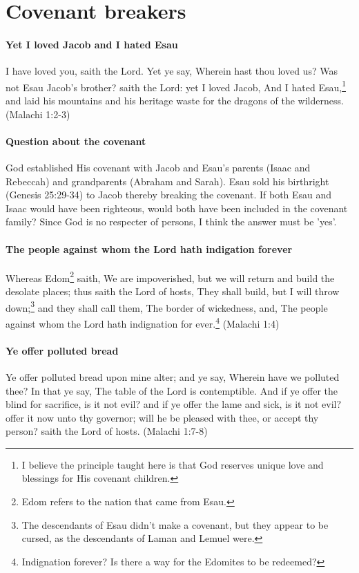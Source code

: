 \section{Covenant breakers}

\paragraph{Yet I loved Jacob and I hated Esau}
I have loved you, saith the Lord. Yet ye say, Wherein hast thou loved us? Was not Esau Jacob's brother? saith the Lord: yet I loved Jacob, And I hated Esau,\footnote{I believe the principle taught here is that God reserves unique love and blessings for His covenant children.} and laid his mountains and his heritage waste for the dragons of the wilderness. (Malachi 1:2-3)

\paragraph{Question about the covenant}
God established His covenant with Jacob and Esau's parents (Isaac and Rebeccah) and grandparents (Abraham and Sarah). Esau sold his birthright (Genesis 25:29-34) to Jacob thereby breaking the covenant. If both Esau and Isaac would have been righteous, would both have been included in the covenant family? Since God is no respecter of persons, I think the answer must be 'yes'.

\paragraph{The people against whom the Lord hath indigation forever}
Whereas Edom\footnote{Edom refers to the nation that came from Esau.} saith, We are impoverished, but we will return and build the desolate places; thus saith the Lord of hosts, They shall build, but I will throw down;\footnote{The descendants of Esau didn't make a covenant, but they appear to be cursed, as the descendants of Laman and Lemuel were.} and they shall call them, The border of wickedness, and, The people against whom the Lord hath indignation for ever.\footnote{Indignation forever? Is there a way for the Edomites to be redeemed?} (Malachi 1:4)

\paragraph{Ye offer polluted bread}
Ye offer polluted bread upon mine alter; and ye say, Wherein have we polluted thee? In that ye say, The table of the Lord is contemptible. And if ye offer the blind for sacrifice, is it not evil? and if ye offer the lame and sick, is it not evil? offer it now unto thy governor; will he be pleased with thee, or accept thy person? saith the Lord of hosts. (Malachi 1:7-8)

